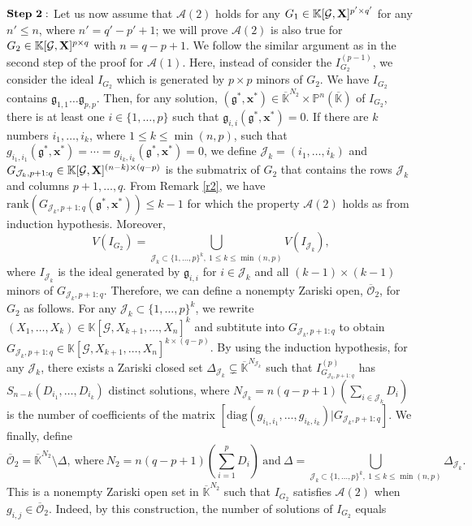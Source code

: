 \documentclass[11pt]{article}
\numberwithin{Property}{section}
\numberwithin{Theorem}{section}
\numberwithin{Proposition}{section}
\numberwithin{Lemma}{section}
\numberwithin{Corollary}{section}
\numberwithin{Definition}{section}
\numberwithin{Remark}{section}
\numberwithin{Conjecture}{section}
\numberwithin{Problem}{section}
\numberwithin{Example}{section}
\numberwithin{Claim}{section}
\renewcommand{\leq}{\leqslant}
\def\bar{\overline}
\newcommand{\field}{\mathbb{K}} %
\newcommand{\mat}[1]{\mathbf{\MakeUppercase{#1}}} %
\begin{document}
$\bf{Step \ 2:}$ Let us now assume that $\mathcal{A}(2)$ holds for any $G_1 \in \field[{\mathcal{G}, \mat{X}}]^{p' \times q'}$ for any $n' \leq n$, where $n' = q'-p'+1$; we will prove $\mathcal{A}(2)$ is also true for $G_2 \in \field[\mathcal{G}, \mat{X}]^{p \times q}$ with $n = q-p+1$. We follow the similar argument as in the second step of the proof for $\mathcal{A}(1)$. Here, instead of consider the $I_{G_2}^{(p-1)}$, we consider the ideal $I_{G_2}$ which is generated by $p \times p$ minors of $G_2$. We have $I_{G_2}$ contains $\mathfrak{g}_{1,1}\ldots \mathfrak{g}_{p,p}$. Then, for any solution, $(\mathfrak{g}^*,\mathbf{x}^*) \in \bar{\field}^{N_2} \times \mathbb{P}^n(\bar{\field})$ of $I_{G_2}$, there is at least one $i \in \{1, \ldots, p\}$ such that $\mathfrak{g}_{i,i}(\mathfrak{g}^*,\mathbf{x}^*) = 0$. If there are $k$ numbers $i_1, \ldots, i_k$, where $1 \leq k \leq \min(n,p)$, such that $g_{i_1, i_1}(\mathfrak{g}^*, \mathbf{x}^*) = \cdots = g_{i_k, i_k}(\mathfrak{g}^*, \mathbf{x}^*) = 0$, we define $\mathcal{J}_k = (i_1, \ldots, i_k)$ and $G_{\mathcal{J}_k, p+1:q} \in \field[\mathcal{G}, \mat{X}]^{(n-k)\times (q-p)}$ is the submatrix of $G_2$ that contains the rows $\mathcal{J}_k$ and columns $p+1, \ldots, q$. From Remark \ref{r2}, we have $\mathrm{rank}(G_{\mathcal{J}_k, p+1:q}(\mathfrak{g}^*, \mathbf{x}^*)) \leq k-1$ for which the property $\mathcal{A}(2)$ holds as from induction hypothesis. Moreover, $$V(I_{G_2}) = \bigcup\limits_{\mathcal{J}_k \subset\{1, \ldots, p\}^k, \ 1 \leq k \leq \min(n,p)} V(I_{\mathcal{J}_k}),$$ where $I_{\mathcal{J}_k}$ is the ideal generated by $\mathfrak{g}_{i,i}$ for $i \in \mathcal{J}_k$ and all $(k-1)\times(k-1)$ minors of $G_{\mathcal{J}_k, p+1:q}$. Therefore, we can define a nonempty Zariski open, $\bar{\mathcal{O}}_2$, for $G_2$ as follows. For any $\mathcal{J}_k \subset \{1, \ldots, p\}^k$, we rewrite $(X_1, \ldots, X_k) \in \field[\mathcal{G}, X_{k+1}, \ldots, X_n]^{k}$ and subtitute into $G_{\mathcal{J}_k, p+1:q}$ to obtain $G_{\mathcal{J}_k, p+1:q} \in \field[\mathcal{G}, X_{k+1}, \ldots, X_n]^{k \times {(q-p)}}$. By using the induction hypothesis, for any $\mathcal{J}_k$, there exists a Zariski closed set $\Delta_{\mathcal{J}_k} \subsetneq \bar{\field}^{N_{\mathcal{J}_k}}$ such that $I_{G_{\mathcal{J}_k, p+1:q}}^{(p)}$ has $S_{n-k}(D_{i_1}, \ldots, D_{i_k})$ distinct solutions, where $N_{\mathcal{J}_k} = n(q-p+1)(\sum_{i \in \mathcal{J}_k}D_i)$ is the number of coefficients of the matrix $[\mathrm{diag}(g_{i_1, i_1}, \ldots, g_{i_k, i_k})|G_{\mathcal{J}_k, p+1:q}]$. We finally, define \[\bar{\mathcal{O}}_2 = \bar{\field}^{N_2} \setminus \Delta, \ \mathrm{where}\  N_2 = n(q-p+1)(\sum_{i=1}^pD_i) \ \mathrm{and} \ \Delta = \bigcup_{\mathcal{J}_k \subset\{1, \ldots, p\}^k, \ 1 \leq k \leq \min(n,p)}\Delta_{\mathcal{J}_k}.\]
This is a nonempty Zariski open set in $\bar{\field}^{N_2}$ such that $I_{G_2}$ satisfies $\mathcal{A}(2)$ when $g_{i,j} \in \bar{\mathcal{O}}_2$. Indeed, by this construction, the number of solutions of $I_{G_2}$ equals
\end{document}
